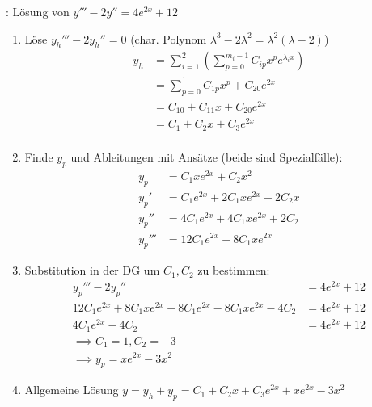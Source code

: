 \Bsp {}: Lösung von $y''' - 2y'' = 4e^{2x} + 12$
\begin{enumerate}
    \item Löse $y_h''' - 2y_h'' = 0$ (char. Polynom $\lambda^3 - 2\lambda^2 = \lambda^2(\lambda - 2)$)
        \vspace{-0.4em}
        \begin{align*}
            y_h &= \sum_{i = 1}^{2} (\sum_{p=0}^{m_i - 1} C_{ip} x^p e^{\lambda_i x}) \\[-0.6em]
                &= \sum_{p = 0}^1 C_{1p} x^p + C_{20} e^{2x} \\[-0.6em]
                &= C_{10} + C_{11}x + C_{20}e^{2x} \\[-0.6em]
                &= C_1 + C_2x + C_3e^{2x} \\[-0.6em]
        \end{align*}
    \item Finde $y_p$ und Ableitungen mit Ansätze (beide sind Spezialfälle):
        \vspace{-1em}
        \begin{align*}
            y_p &= C_1 x e^{2x} + C_2 x^2 \\[-0.4em]
            y_p' &= C_1 e^{2x} + 2 C_1 x e^{2x} + 2C_2 x \\[-0.4em]
            y_p'' &= 4C_1e^{2x} + 4C_1 x e^{2x} + 2C_2 \\[-0.4em]
            y_p''' &= 12 C_1 e^{2x} + 8C_1 x e^{2x}
        \end{align*}
    \item Substitution in der DG um $C_1, C_2$ zu bestimmen:
        \begin{align*}
            y_p''' - 2y_p'' &= 4e^{2x} + 12 \\[-0.3em]
            12C_1 e^{2x} + 8C_1xe^{2x} - 8C_1e^{2x} - 8C_1xe^{2x} - 4C_2 &= 4e^{2x} + 12 \\[-0.6em]
            4C_1 e^{2x} - 4C_2 &= 4e^{2x} + 12 \\[-0.6em]
            \implies C_1 = 1, C_2 = -3 \hspace{60pt}& \\[-0.6em]
            \implies y_p = x e^{2x} - 3 x^2 \hspace{61pt}&
        \end{align*}
    \item Allgemeine Lösung $y = y_h + y_p = C_1 + C_2x + C_3e^{2x} + x e^{2x} - 3 x^2$
\end{enumerate}

